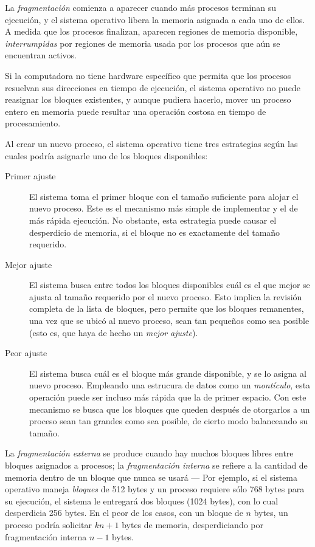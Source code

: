 \documentclass[11pt,fleqn]{book} %
\begin{document}
La \emph{fragmentación} comienza a aparecer cuando más procesos terminan su
ejecución, y el sistema operativo libera la memoria asignada a cada
uno de ellos. A medida que los procesos finalizan, aparecen regiones
de memoria disponible, \emph{interrumpidas} por regiones de memoria usada por los
procesos que aún se encuentran activos. 

Si la computadora no tiene hardware específico que permita que los
procesos resuelvan sus direcciones en tiempo de ejecución, el sistema
operativo no puede reasignar los bloques existentes, y aunque pudiera
hacerlo, mover un proceso entero en memoria puede resultar una
operación costosa en tiempo de procesamiento.

Al crear un nuevo proceso, el sistema operativo tiene tres
estrategias según las cuales podría asignarle uno de los bloques
disponibles:

\begin{description}
\item[Primer ajuste] El sistema toma el primer bloque con el tamaño 
                   suficiente para alojar el nuevo proceso. Este
                   es el mecanismo más simple de implementar y el de 
                   más rápida ejecución. No obstante, esta estrategia
                   puede causar el desperdicio de memoria, si el bloque
		   no es exactamente del tamaño requerido.
\item[Mejor ajuste] El sistema busca entre todos los bloques disponibles
                  cuál es el que mejor se ajusta al tamaño requerido
                  por el nuevo proceso. Esto implica la revisión
                  completa de la lista de bloques, pero permite que los
                  bloques remanentes, una vez que se ubicó al nuevo
                  proceso, sean tan pequeños como sea posible (esto
                  es, que haya de hecho un \emph{mejor ajuste}).
\item[Peor ajuste] El sistema busca cuál es el bloque más grande
                 disponible, y se lo asigna al nuevo
                 proceso. Empleando una estrucura de datos como un
                 \emph{montículo}, esta operación puede ser incluso más
                 rápida que la de primer espacio. Con este mecanismo
                 se busca que los bloques que queden después de
                 otorgarlos a un proceso sean tan grandes como sea
                 posible, de cierto modo balanceando su tamaño.
\end{description}

La \emph{fragmentación externa} se produce cuando hay muchos bloques libres
entre bloques asignados a procesos; la \emph{fragmentación interna} se
refiere a la cantidad de memoria dentro de un bloque que nunca se usará —
Por ejemplo, si el sistema operativo maneja \emph{bloques} de 512 bytes y
un proceso requiere sólo 768 bytes para su ejecución, el sistema le
entregará dos bloques (1024 bytes), con lo cual desperdicia 256 bytes. En el
peor de los casos, con un bloque de $n$ bytes, un proceso podría
solicitar $kn+1$ bytes de memoria, desperdiciando por fragmentación
interna $n-1$ bytes.
\end{document}
